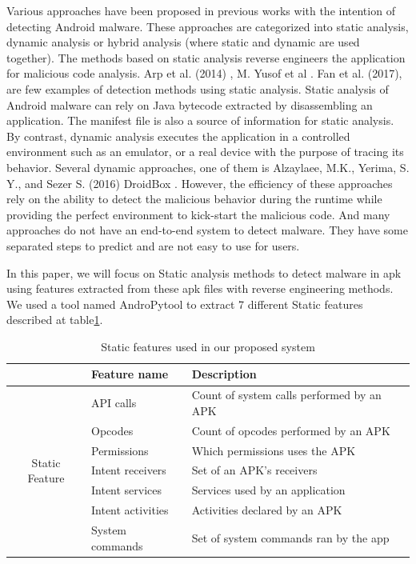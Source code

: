 Various approaches have been proposed in previous works with the intention of detecting Android malware. These approaches are categorized into static analysis, dynamic analysis or hybrid analysis (where static and dynamic are used together). The methods based on static analysis reverse engineers the application for malicious code analysis. Arp et al. (2014) \cite{drebin}, M. Yusof et al \cite{apicallpaper}. Fan et al. (2017)\cite{dapasa}, are few examples of detection methods using static analysis. Static analysis of Android malware can rely on Java bytecode extracted by disassembling an application. The manifest file is also a source of information for static analysis. By contrast, dynamic analysis executes the application in a controlled environment such as an emulator, or a real device with the purpose of tracing its behavior. Several dynamic approaches, one of them is Alzaylaee, M.K., Yerima, S. Y., and Sezer S. (2016) DroidBox \cite{andropytool}. However, the efficiency of these approaches rely on the ability to detect the malicious behavior during the runtime while providing the perfect environment to kick-start the malicious code.
And many approaches do not have an end-to-end system to detect malware. They have some separated steps to predict and are not easy to use for users.

In this paper, we will focus on Static analysis methods to detect malware in \ac{apk} using features extracted from these \ac{apk} files with reverse engineering methods. We used a tool named AndroPytool\cite{andropytool} to extract 7 different Static features described at table\ref{table:1}. 


\begin{table}[htbp]
  \centering
  \caption{Static features used in our proposed system}
  \label{table:1}
  \begin{tabular}{|c||l l|}
  \hline
  & \textbf{Feature name} & \textbf{Description}\\
  \hline
  \multirow{7}{4em}{Static Feature}
   & API calls &  Count of system calls performed by an APK \\ 
   & Opcodes & Count of opcodes performed by an APK \\ 
   & Permissions & Which permissions uses the APK \\ 
   & Intent receivers & Set of an APK’s receivers \\ 
   & Intent services & Services used by an application \\
   & Intent activities & Activities declared by an APK \\ 
   & System commands & Set of system commands ran by the app \\ \hline
  
  \end{tabular}
  \end{table}

